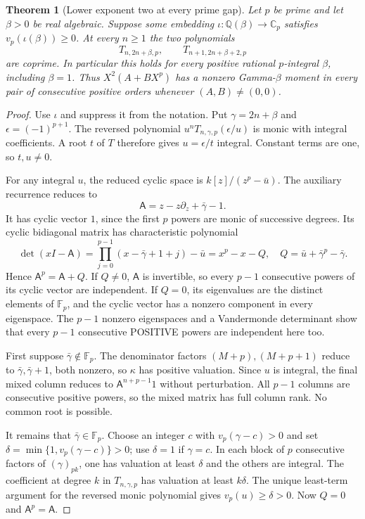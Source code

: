 \documentclass[11pt]{article}
\newtheorem{theorem}{Theorem}
\begin{document}
\begin{theorem}[Lower exponent two at every prime gap]\label{thm:prime}
Let $p$ be prime and let $\beta>0$ be real algebraic.
Suppose some embedding
$\iota:\mathbb Q(\beta)\longrightarrow\mathbb C_p$ satisfies
$v_p(\iota(\beta))\ge0$. At every $n\ge1$ the two polynomials
\[
 T_{n,2n+\beta,p},\qquad T_{n+1,2n+\beta+2,p}
\]
are coprime. In particular this holds for every positive rational
$p$-integral $\beta$, including $\beta=1$.
Thus $X^2(A+BX^p)$ has a nonzero Gamma-$\beta$ moment in every
pair of consecutive positive orders whenever $(A,B)\ne(0,0)$.
\end{theorem}
\begin{proof}
Use $\iota$ and suppress it from the notation.
Put $\gamma=2n+\beta$ and $\epsilon=(-1)^{p+1}$.
The reversed polynomial $u^nT_{n,\gamma,p}(\epsilon/u)$ is monic
with integral coefficients. A root $t$ of $T$ therefore gives
$u=\epsilon/t$ integral. Constant terms are one, so $t,u\ne0$.

For any integral $u$, the reduced cyclic space is
$k[z]/(z^p-\bar u)$. The auxiliary recurrence reduces to
\[
 {\mathsf A}=z-z\partial_z+\bar\gamma-1.
\]
It has cyclic vector $1$, since the first $p$ powers are monic of
successive degrees. Its cyclic bidiagonal matrix has characteristic
polynomial
\[
 \det(xI-{\mathsf A})=
 \prod_{j=0}^{p-1}(x-\bar\gamma+1+j)-\bar u
 =x^p-x-Q,\quad Q=\bar u+\bar\gamma^p-\bar\gamma.
\]
Hence $\mathsf A^p=\mathsf A+Q$.
If $Q\ne0$, $\mathsf A$ is invertible, so every $p-1$
consecutive powers of its cyclic vector are independent.
If $Q=0$, its eigenvalues are the distinct elements of $\mathbb F_p$,
and the cyclic vector has a nonzero component in every eigenspace.
The $p-1$ nonzero eigenspaces and a Vandermonde determinant show
that every $p-1$ consecutive POSITIVE powers are independent here too.

First suppose $\bar\gamma\notin\mathbb F_p$.
The denominator factors $(M+p),(M+p+1)$ reduce to
$\bar\gamma,\bar\gamma+1$, both nonzero, so $\kappa$ has positive
valuation. Since $u$ is integral, the final mixed column reduces
to $\mathsf A^{n+p-1}1$ without perturbation.
All $p-1$ columns are consecutive positive powers, so the mixed
matrix has full column rank. No common root is possible.

It remains that $\bar\gamma\in\mathbb F_p$.
Choose an integer $c$ with $v_p(\gamma-c)>0$ and set
$\delta=\min\{1,v_p(\gamma-c)\}>0$; use $\delta=1$ if $\gamma=c$.
In each block of $p$ consecutive factors of $(\gamma)_{pk}$,
one has valuation at least $\delta$ and the others are integral.
The coefficient at degree $k$ in $T_{n,\gamma,p}$ has valuation
at least $k\delta$. The unique least-term argument for the reversed
monic polynomial gives $v_p(u)\ge\delta>0$.
Now $Q=0$ and $\mathsf A^p=\mathsf A$.


\end{proof}
\end{document}
